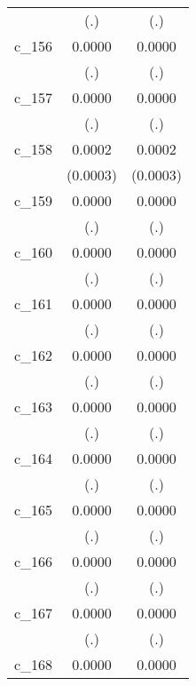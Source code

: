 {\begin{tabular}{l*{2}{c}}
            &         (.)        &         (.)        \\
[1em]
c\_156       &      0.0000        &      0.0000        \\
            &         (.)        &         (.)        \\
[1em]
c\_157       &      0.0000        &      0.0000        \\
            &         (.)        &         (.)        \\
[1em]
c\_158       &      0.0002        &      0.0002        \\
            &    (0.0003)        &    (0.0003)        \\
[1em]
c\_159       &      0.0000        &      0.0000        \\
            &         (.)        &         (.)        \\
[1em]
c\_160       &      0.0000        &      0.0000        \\
            &         (.)        &         (.)        \\
[1em]
c\_161       &      0.0000        &      0.0000        \\
            &         (.)        &         (.)        \\
[1em]
c\_162       &      0.0000        &      0.0000        \\
            &         (.)        &         (.)        \\
[1em]
c\_163       &      0.0000        &      0.0000        \\
            &         (.)        &         (.)        \\
[1em]
c\_164       &      0.0000        &      0.0000        \\
            &         (.)        &         (.)        \\
[1em]
c\_165       &      0.0000        &      0.0000        \\
            &         (.)        &         (.)        \\
[1em]
c\_166       &      0.0000        &      0.0000        \\
            &         (.)        &         (.)        \\
[1em]
c\_167       &      0.0000        &      0.0000        \\
            &         (.)        &         (.)        \\
[1em]
c\_168       &      0.0000        &      0.0000        \\

\end{tabular}}
